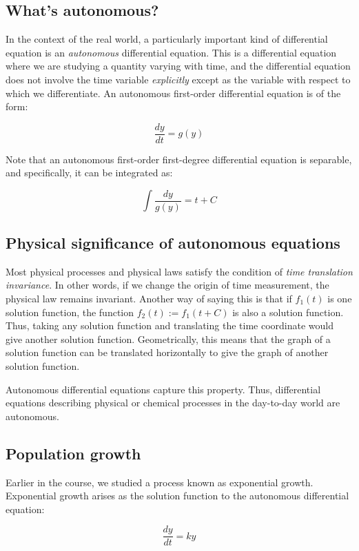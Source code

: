 \documentclass{amsart}
\begin{document}
\subsection{What's autonomous?}

In the context of the real world, a particularly important kind of
differential equation is an {\em autonomous} differential
equation. This is a differential equation where we are studying a
quantity varying with time, and the differential equation does not
involve the time variable {\em explicitly} except as the variable with
respect to which we differentiate. An autonomous first-order
differential equation is of the form:

$$\frac{dy}{dt} = g(y)$$

Note that an autonomous first-order first-degree differential equation is
separable, and specifically, it can be integrated as:

$$\int \frac{dy}{g(y)} = t + C$$

\subsection{Physical significance of autonomous equations}

Most physical processes and physical laws satisfy the condition of
{\em time translation invariance}. In other words, if we change the
origin of time measurement, the physical law remains
invariant. Another way of saying this is that if $f_1(t)$ is one
solution function, the function $f_2(t) := f_1(t + C)$ is also a
solution function. Thus, taking any solution function and translating
the time coordinate would give another solution
function. Geometrically, this means that the graph of a solution
function can be translated horizontally to give the graph of another
solution function.

Autonomous differential equations capture this property. Thus,
differential equations describing physical or chemical processes in
the day-to-day world are autonomous.

\subsection{Population growth}

Earlier in the course, we studied a process known as exponential
growth. Exponential growth arises as the solution function to the
autonomous differential equation:

$$\frac{dy}{dt} = ky$$
\end{document}
